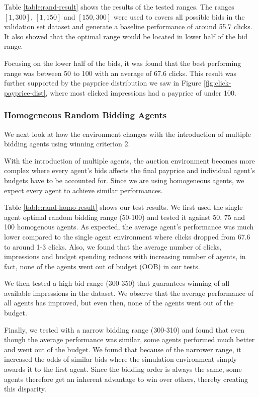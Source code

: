 \documentclass{sig-alternate-05-2015}
\begin{document}
Table \ref{table:rand-result} shows the results of the tested ranges. The ranges $[1, 300]$, $[1, 150]$ and $[150, 300]$ were used to covers all possible bids in the validation set dataset and generate a baseline performance of around 55.7 clicks. It also showed that the optimal range would be located in lower half of the bid range.

Focusing on the lower half of the bids, it was found that the best performing range was between 50 to 100 with an average of 67.6 clicks. This result was further supported by the payprice distribution we saw in Figure \ref{fig:click-payprice-dist}, where most clicked impressions had a payprice of under 100. 

\subsubsection{Homogeneous Random Bidding Agents} \label{homogeneous-agents}
We next look at how the environment changes with the introduction of multiple bidding agents using winning criterion 2. 

With the introduction of multiple agents, the auction environment becomes more complex where every agent's bids affects the final payprice and individual agent's budgets have to be accounted for. Since we are using homogeneous agents, we expect every agent to achieve similar performances.

Table \ref{table:rand-homo-result} shows our test results. We first used the single agent optimal random bidding range (50-100) and tested it against 50, 75 and 100 homogenous agents. As expected, the average agent's performance was much lower compared to the single agent environment where clicks dropped from 67.6 to around 1-3 clicks. Also, we found that the average number of clicks, impressions and budget spending reduces with increasing number of agents, in fact, none of the agents went out of budget (OOB) in our tests.

We then tested a high bid range (300-350) that guarantees winning of all available impressions in the dataset. We observe that the average performance of all agents has improved, but even then, none of the agents went out of the budget.

Finally, we tested with a narrow bidding range (300-310) and found that even though the average performance was similar, some agents performed much better and went out of the budget. We found that because of the narrower range, it increased the odds of similar bids where the simulation environment simply awards it to the first agent. Since the bidding order is always the same, some agents therefore get an inherent advantage to win over others, thereby creating this disparity.
\end{document}
